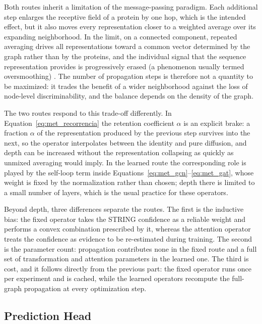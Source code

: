 \documentclass[Ingles]{ic-tese-v3}
\begin{document}
Both routes inherit a limitation of the message-passing paradigm. Each additional step enlarges the
receptive field of a protein by one hop, which is the intended effect, but it also moves every
representation closer to a weighted average over its expanding neighborhood. In the limit, on a
connected component, repeated averaging drives all representations toward a common vector determined
by the graph rather than by the proteins, and the individual signal that the sequence representation
provides is progressively erased (a phenomenon usually termed oversmoothing)
\cite{li2018deeper, oono2020graph}. The number of propagation steps is therefore not a quantity to
be maximized: it trades the benefit of a wider neighborhood against the loss of node-level
discriminability, and the balance depends on the density of the graph.

The two routes respond to this trade-off differently. In Equation~\eqref{eq:met_recorrencia} the
retention coefficient $\alpha$ is an explicit brake: a fraction $\alpha$ of the representation
produced by the previous step survives into the next, so the operator interpolates between the
identity and pure diffusion, and depth can be increased without the representation collapsing as
quickly as unmixed
averaging would imply. In the learned route the corresponding role is played by the self-loop term
inside Equations~\eqref{eq:met_gcn}--\eqref{eq:met_gat}, whose weight is fixed by the normalization
rather than chosen; depth there is limited to a small number of layers, which is the usual practice
for these operators.

Beyond depth, three differences separate the routes. The first is the inductive bias: the fixed
operator takes the STRING confidence as a reliable weight and performs a convex combination
prescribed by it, whereas the attention operator treats the confidence as evidence to be
re-estimated during training. The second is the parameter count: propagation contributes none in the
fixed route and a full set of transformation and attention parameters in the learned one. The third
is cost, and it follows directly from the previous part: the fixed operator runs once per
experiment and is cached, while the learned operators recompute the full-graph propagation at every
optimization step.

\subsection{Prediction Head}
\label{sec:met_heads}
\end{document}
